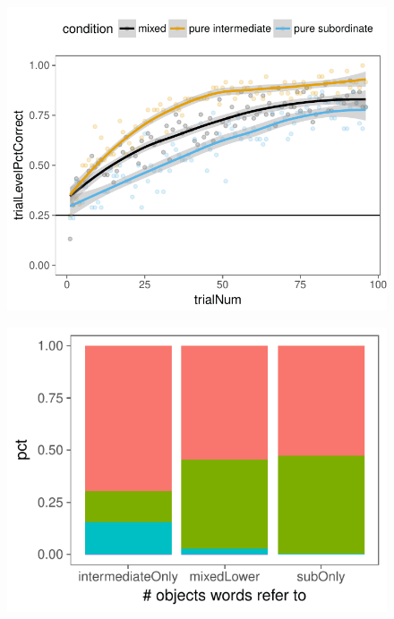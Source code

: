 \documentclass[10pt,letterpaper]{article}
\begin{document}
\begin{figure}[t]
\begin{center}
{\includegraphics[scale=0.6]{accuracyByCondition.pdf}}
{\caption{{\footnotesize {}   \label{fig:accuracy}}}}
\end{center}
\end{figure}

\begin{figure}[t]
\begin{center}
{\includegraphics[scale=.64]{lexiconContent.pdf}}
{\caption{{\footnotesize {}  \label{fig:lexiconContent}}}}
\end{center}
\end{figure}
\end{document}
